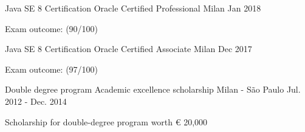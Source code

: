 


\begin{cventries}

  \cventry
    {Java SE 8 Certification} %
    {Oracle Certified Professional} %
    {Milan} %
    {Jan 2018} %
    {
      \begin{cvitems} %
        \item {Exam outcome: (90/100)}
      \end{cvitems}
    }

  \cventry
    {Java SE 8 Certification} %
    {Oracle Certified Associate} %
    {Milan} %
    {Dec 2017} %
    {
      \begin{cvitems} %
        \item {Exam outcome: (97/100)}
      \end{cvitems}
    }


  \cventry
    {Double degree program} %
    {Academic excellence scholarship} %
    {Milan - São Paulo} %
    {Jul. 2012 - Dec. 2014} %
    {
      \begin{cvitems} %
        \item {Scholarship for double-degree program worth € 20,000}
      \end{cvitems}
    }

\end{cventries}
